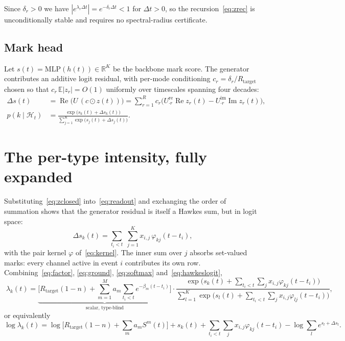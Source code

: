\documentclass[11pt]{article}
\theoremstyle{remark}
\newcommand{\Hist}{\mathcal{H}}
\newcommand{\R}{\mathbb{R}}
\newcommand{\E}{\mathbb{E}}
\newcommand{\Real}{\operatorname{Re}}
\newcommand{\Imag}{\operatorname{Im}}
\newcommand{\Rtar}{R_{\mathrm{target}}}
\begin{document}
Since $\delta_r>0$ we have $|e^{\lambda_r\Delta t}|=e^{-\delta_r\Delta t}<1$ for
$\Delta t>0$, so the recursion~\eqref{eq:zrec} is unconditionally stable and
requires no spectral-radius certificate.

\subsection{Mark head}

Let $s(t)=\mathrm{MLP}(h(t))\in\R^{K}$ be the backbone mark score. The generator
contributes an additive logit residual, with per-mode conditioning
$c_r=\delta_r/\Rtar$ chosen so that $c_r\,\E|z_r|=O(1)$ uniformly over
timescales spanning four decades:
\begin{align}
\Delta s(t)&=\Real\!\big(U\,(c\odot z(t))\big)
=\sum_{r=1}^{R}c_r\Big(U^{\mathrm{re}}_{\cdot r}\Real z_r(t)
-U^{\mathrm{im}}_{\cdot r}\Imag z_r(t)\Big),
\label{eq:readout}\\[2pt]
p(k\mid\Hist_t)&=\frac{\exp\!\big(s_k(t)+\Delta s_k(t)\big)}
{\sum_{j=1}^{K}\exp\!\big(s_j(t)+\Delta s_j(t)\big)} .
\label{eq:softmax}
\end{align}

\section{The per-type intensity, fully expanded}

Substituting~\eqref{eq:zclosed} into~\eqref{eq:readout} and exchanging the order
of summation shows that the generator residual is itself a Hawkes sum, but in
logit space:
\begin{equation}
\Delta s_k(t)=\sum_{t_i<t}\;\sum_{j=1}^{K}x_{i,j}\,\varphi_{kj}(t-t_i),
\label{eq:hawkeslogit}
\end{equation}
with the pair kernel $\varphi$ of~\eqref{eq:kernel}. The inner sum over $j$
absorbs set-valued marks: every channel active in event $i$ contributes its own
row. Combining~\eqref{eq:factor}, \eqref{eq:ground}, \eqref{eq:softmax}
and~\eqref{eq:hawkeslogit},
\begin{equation}
\boxed{\;
\lambda_k(t)=
\underbrace{\Big[\Rtar(1-n)+\sum_{m=1}^{M}a_m\!\!\sum_{t_i<t}\!e^{-\beta_m(t-t_i)}\Big]}
_{\textstyle \text{scalar, type-blind}}
\cdot
\frac{\exp\!\Big(s_k(t)+\sum_{t_i<t}\sum_j x_{i,j}\varphi_{kj}(t-t_i)\Big)}
{\sum_{l=1}^{K}\exp\!\Big(s_l(t)+\sum_{t_i<t}\sum_j x_{i,j}\varphi_{lj}(t-t_i)\Big)} ,\;}
\label{eq:full}
\end{equation}
or equivalently
\begin{equation}
\log\lambda_k(t)=
\log\Big[\Rtar(1-n)+\sum_m a_m S^m(t)\Big]
+s_k(t)
+\sum_{t_i<t}\sum_j x_{i,j}\varphi_{kj}(t-t_i)
-\log\sum_{l}e^{s_l+\Delta s_l} .
\end{equation}
\end{document}
